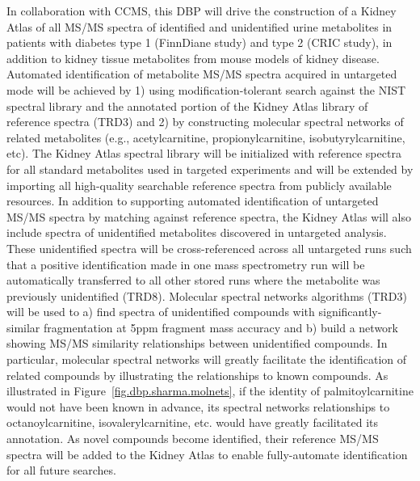 \documentclass[arial,11pt]{article}
\begin{document}
In collaboration with CCMS, this DBP will drive the construction of a Kidney Atlas of all MS/MS spectra of identified and unidentified urine metabolites in patients with diabetes type 1 (FinnDiane study) and type 2 (CRIC study), in addition to kidney tissue metabolites from mouse models of kidney disease. Automated identification of metabolite MS/MS spectra acquired in untargeted mode will be achieved by 1) using modification-tolerant search against the NIST spectral library and the annotated portion of the Kidney Atlas library of reference spectra (TRD3) and 2) by constructing molecular spectral networks of related metabolites (e.g., acetylcarnitine, propionylcarnitine, isobutyrylcarnitine, etc). The Kidney Atlas spectral library will be initialized with reference spectra for all standard metabolites used in targeted experiments and will be extended by importing all high-quality searchable reference spectra from publicly available resources. In addition to supporting automated identification of untargeted MS/MS spectra by matching against reference spectra, the Kidney Atlas will also include spectra of unidentified metabolites discovered in untargeted analysis. These unidentified spectra will be cross-referenced across all untargeted runs such that a positive identification made in one mass spectrometry run will be automatically transferred to all other stored runs where the metabolite was previously unidentified (TRD8). Molecular spectral networks algorithms (TRD3) will be used to a) find spectra of unidentified compounds with significantly-similar fragmentation at 5ppm fragment mass accuracy and b) build a network showing MS/MS similarity relationships between unidentified compounds. In particular, molecular spectral networks will greatly facilitate the identification of related compounds by illustrating the relationships to known compounds. As illustrated in Figure~\ref{fig.dbp.sharma.molnets}, if the identity of palmitoylcarnitine would not have been known in advance, its spectral networks relationships to octanoylcarnitine, isovalerylcarnitine, etc. would have greatly facilitated its annotation. As novel compounds become identified, their reference MS/MS spectra will be added to the Kidney Atlas to enable fully-automate identification for all future searches.
\end{document}
